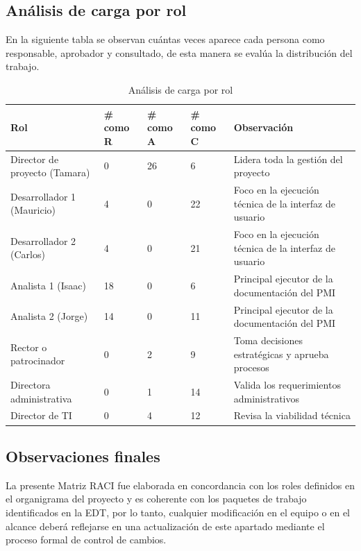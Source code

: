 \documentclass[11pt,spanish]{article}
\begin{document}
\subsection{Análisis de carga por rol}

En la siguiente tabla se observan cuántas veces aparece cada persona como responsable, aprobador y consultado, de esta manera se evalúa la distribución del trabajo.

\begin{table}[H]
\centering
\caption{Análisis de carga por rol}
\label{tab:analisis-carga-rol}
{\small
\setlength{\tabcolsep}{3.5pt}
\begin{tabularx}{\textwidth}{p{4.2cm} C{1.5cm} C{1.5cm} C{1.5cm} Y}
\toprule
\textbf{Rol} & \textbf{\# como R} & \textbf{\# como A} & \textbf{\# como C} & \textbf{Observación} \\
\midrule
Director de proyecto (Tamara) & 0 & 26 & 6 & Lidera toda la gestión del proyecto \\
Desarrollador 1 (Mauricio) & 4 & 0 & 22 & Foco en la ejecución técnica de la interfaz de usuario \\
Desarrollador 2 (Carlos) & 4 & 0 & 21 & Foco en la ejecución técnica de la interfaz de usuario \\
Analista 1 (Isaac) & 18 & 0 & 6 & Principal ejecutor de la documentación del PMI \\
Analista 2 (Jorge) & 14 & 0 & 11 & Principal ejecutor de la documentación del PMI \\
Rector o patrocinador & 0 & 2 & 9 & Toma decisiones estratégicas y aprueba procesos \\
Directora administrativa & 0 & 1 & 14 & Valida los requerimientos administrativos \\
Director de TI & 0 & 4 & 12 & Revisa la viabilidad técnica \\
\bottomrule
\end{tabularx}
}
\end{table}

\subsection{Observaciones finales}

La presente Matriz RACI fue elaborada en concordancia con los roles definidos en el organigrama del proyecto y es coherente con los paquetes de trabajo identificados en la EDT, por lo tanto, cualquier modificación en el equipo o en el alcance deberá reflejarse en una actualización de este apartado mediante el proceso formal de control de cambios.
\end{document}
